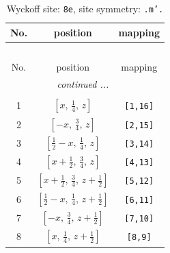 \documentclass[fleqn,8pt]{jsarticle}
\begin{document}
\begin{longtable}{ccc}
\caption{Wyckoff site: {\tt 8e}, site symmetry: {\tt .m'.}}
 \\
 \hline \hline
No. & position & mapping \\ \hline \endfirsthead

\multicolumn{2}{l}{\tablename\ \thetable{}} \\
 \hline \hline
No. & position & mapping \\ \hline \endhead

 \hline \hline
\multicolumn{2}{r}{\footnotesize\it continued ...} \\ \endfoot

 \hline \hline
\multicolumn{2}{r}{} \\ \endlastfoot

1 & $\left[ x,\, \frac{1}{4},\, z \right]$ & {\tt [1,16]} \\ \hline
2 & $\left[ - x,\, \frac{3}{4},\, z \right]$ & {\tt [2,15]} \\ \hline
3 & $\left[ \frac{1}{2} - x,\, \frac{1}{4},\, z \right]$ & {\tt [3,14]} \\ \hline
4 & $\left[ x + \frac{1}{2},\, \frac{3}{4},\, z \right]$ & {\tt [4,13]} \\ \hline
5 & $\left[ x + \frac{1}{2},\, \frac{3}{4},\, z + \frac{1}{2} \right]$ & {\tt [5,12]} \\ \hline
6 & $\left[ \frac{1}{2} - x,\, \frac{1}{4},\, z + \frac{1}{2} \right]$ & {\tt [6,11]} \\ \hline
7 & $\left[ - x,\, \frac{3}{4},\, z + \frac{1}{2} \right]$ & {\tt [7,10]} \\ \hline
8 & $\left[ x,\, \frac{1}{4},\, z + \frac{1}{2} \right]$ & {\tt [8,9]} \\
\end{longtable}
\renewcommand{\arraystretch}{1.2}
\end{document}
